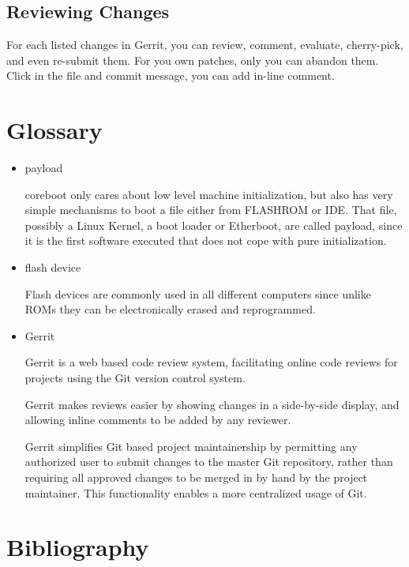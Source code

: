 \documentclass[titlepage,12pt]{article}
\begin{document}
{\subsection{Reviewing Changes}
For each listed changes in Gerrit, you can review, comment, evaluate,
cherry-pick, and even re-submit them. For you own patches, only you can
abandon them. Click in the file and commit message, you can add in-line comment.

%
%

\section{Glossary}
\begin{itemize}
\item payload

coreboot only cares about low level machine initialization, but also has
very simple mechanisms to boot a file either from FLASHROM or IDE. That
file, possibly a Linux Kernel, a boot loader or Etherboot, are called
payload, since it is the first software executed that does not cope with
pure initialization.

\item flash device

Flash devices are commonly used in all different computers since unlike
ROMs they can be electronically erased and reprogrammed.

\item Gerrit

Gerrit is a web based code review system, facilitating online code
reviews for projects using the Git version control system.

Gerrit makes reviews easier by showing changes in a side-by-side
display, and allowing inline comments to be added by any reviewer.

Gerrit simplifies Git based project maintainership by permitting any
authorized user to submit changes to the master Git repository, rather
than requiring all approved changes to be merged in by hand by the
project maintainer. This functionality enables a more centralized
usage of Git.

\end{itemize}

\newpage

%
%

\section{Bibliography}
}
\end{document}
